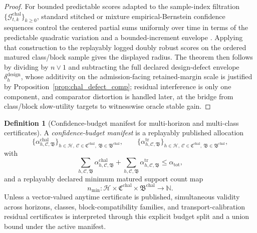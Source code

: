 \documentclass[11pt]{article}
\theoremstyle{definition}
\newtheorem{definition}[theorem]{Definition}
\newcommand{\N}{\mathbb{N}}
\newcommand{\1}{\mathbf{1}}
\begin{document}
\begin{proof}
For bounded predictable scores adapted to the sample-index filtration $\{\mathcal G_{t,k}^{\mathrm{chal}}\}_{k\ge0}$, standard stitched or mixture empirical-Bernstein confidence sequences control the centered partial sums uniformly over time in terms of the predictable quadratic variation and a bounded-increment envelope \cite{HowardRamdasMcAuliffeSekhon2021,RamdasGrunwaldVovkShafer2023}. Applying that construction to the replayably logged doubly robust scores on the ordered matured class/block sample gives the displayed radius. The theorem then follows by dividing by $n\vee1$ and subtracting the full declared design-defect envelope $\delta_h^{\mathrm{design}}$, whose additivity on the admission-facing retained-margin scale is justified by Proposition~\ref{prop:chal_defect_comp}; residual interference is only one component, and comparator distortion is handled later, at the bridge from class/block slow-utility targets to witnesswise oracle stable gain.
\end{proof}

\begin{definition}[Confidence-budget manifest for multi-horizon and multi-class certificates]\label{def:confidence_manifest}
A \emph{confidence-budget manifest} is a replayably published allocation
\[
\{\alpha_{h,\mathcal C,\mathfrak B}^{\mathrm{chal}}\}_{h\in\mathcal H,\ \mathcal C\in\mathfrak C^{\mathrm{chal}},\ \mathfrak B\in\mathfrak B^{\mathrm{chal}}},
\qquad
\{\alpha_{h,\mathcal C,\mathfrak B}^{\mathrm{tr}}\}_{h\in\mathcal H,\ \mathcal C\in\mathfrak C^{\mathrm{chal}},\ \mathfrak B\in\mathfrak B^{\mathrm{chal}}},
\]
with
\[
\sum_{h,\mathcal C,\mathfrak B}\alpha_{h,\mathcal C,\mathfrak B}^{\mathrm{chal}}+
\sum_{h,\mathcal C,\mathfrak B}\alpha_{h,\mathcal C,\mathfrak B}^{\mathrm{tr}}
\le \alpha_{\mathrm{tot}},
\]
and a replayably declared minimum matured support count map
\[
n_{\min}:\mathcal H\times\mathfrak C^{\mathrm{chal}}\times\mathfrak B^{\mathrm{chal}}\to\N.
\]
Unless a vector-valued anytime certificate is published, simultaneous validity across horizons, classes, block-compatibility families, and transport-calibration residual certificates is interpreted through this explicit budget split and a union bound under the active manifest.
\end{definition}
\end{document}
